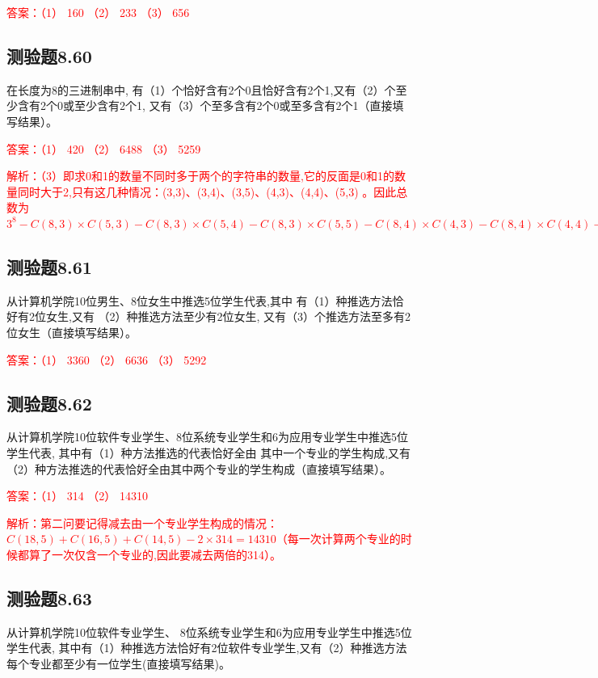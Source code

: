 \documentclass[UTF8, heading=true]{ctexart}
\begin{document}
\textcolor{red}{答案：（1） 160 （2） 233 （3） 656}

\subsection{测验题8.60}

在长度为8的三进制串中,
有（1）个恰好含有2个0且恰好含有2个1,又有（2）个至少含有2个0或至少含有2个1,
又有（3）个至多含有2个0或至多含有2个1（直接填写结果）。

\textcolor{red}{答案：（1） 420 （2） 6488 （3） 5259}

\textcolor{red}{解析：（3）即求0和1的数量不同时多于两个的字符串的数量,它的反面是0和1的数量同时大于2,只有这几种情况：(3,3)、(3,4)、(3,5)、(4,3)、(4,4)、(5,3)
。因此总数为$3^8-C(8,3)\times C(5,3)-C(8,3)\times C(5,4)-C(8,3)\times C(5,5)-C(8,4)\times C(4,3)-C(8,4)\times C(4,4)-C(8,5)\times C(3,3)=5259$}


\subsection{测验题8.61}

从计算机学院10位男生、8位女生中推选5位学生代表,其中
有（1）种推选方法恰好有2位女生,又有
（2）种推选方法至少有2位女生,
又有（3）个推选方法至多有2位女生（直接填写结果）。

\textcolor{red}{答案：（1） 3360 （2） 6636 （3） 5292}

\subsection{测验题8.62}
从计算机学院10位软件专业学生、8位系统专业学生和6为应用专业学生中推选5位学生代表,
其中有（1）种方法推选的代表恰好全由
其中一个专业的学生构成,又有（2）种方法推选的代表恰好全由其中两个专业的学生构成（直接填写结果）。

\textcolor{red}{答案：（1） 314 （2） 14310}

\textcolor{red}{解析：第二问要记得减去由一个专业学生构成的情况：$C(18,5)+C(16,5)+C(14,5)-2\times 314 = 14310$（每一次计算两个专业的时候都算了一次仅含一个专业的,因此要减去两倍的314）。}

\subsection{测验题8.63}
从计算机学院10位软件专业学生、
8位系统专业学生和6为应用专业学生中推选5位学生代表,
其中有（1）种推选方法恰好有2位软件专业学生,又有（2）种推选方法每个专业都至少有一位学生(直接填写结果)。
\end{document}
